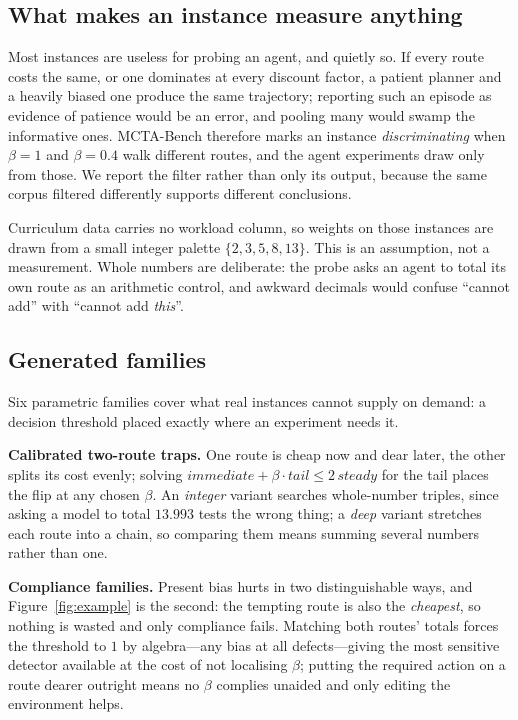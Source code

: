 \documentclass[10pt]{article}
\begin{document}
\subsection{What makes an instance measure anything}
\label{sec:discriminating}

Most instances are useless for probing an agent, and quietly so. If every route
costs the same, or one dominates at every discount factor, a patient planner and a
heavily biased one produce the same trajectory; reporting such an episode as evidence
of patience would be an error, and pooling many would swamp the informative ones.
MCTA-Bench therefore marks an instance \emph{discriminating} when $\beta = 1$ and
$\beta = 0.4$ walk different routes, and the agent experiments draw only from those.
We report the filter rather than only its output, because the same corpus filtered
differently supports different conclusions.

Curriculum data carries no workload column, so weights on those instances are drawn
from a small integer palette $\{2,3,5,8,13\}$. This is an assumption, not a
measurement. Whole numbers are deliberate: the probe asks an agent to total its own
route as an arithmetic control, and awkward decimals would confuse ``cannot add''
with ``cannot add \emph{this}''.

\subsection{Generated families}

Six parametric families cover what real instances cannot supply on demand: a
decision threshold placed exactly where an experiment needs it.

\textbf{Calibrated two-route traps.} One route is cheap now and dear later, the
other splits its cost evenly; solving
$\textit{immediate} + \beta \cdot \textit{tail} \le 2\,\textit{steady}$ for the tail
places the flip at any chosen $\beta$. An \emph{integer} variant searches whole-number
triples, since asking a model to total $13.993$ tests the wrong thing; a \emph{deep}
variant stretches each route into a chain, so comparing them means summing several
numbers rather than one.

\textbf{Compliance families.} Present bias hurts in two distinguishable ways, and
Figure~\ref{fig:example} is the second: the tempting route is also the
\emph{cheapest}, so nothing is wasted and only compliance fails. Matching both
routes' totals forces the threshold to $1$ by algebra---any bias at all
defects---giving the most sensitive detector available at the cost of not localising
$\beta$; putting the required action on a route dearer outright means no $\beta$
complies unaided and only editing the environment helps.
\end{document}
